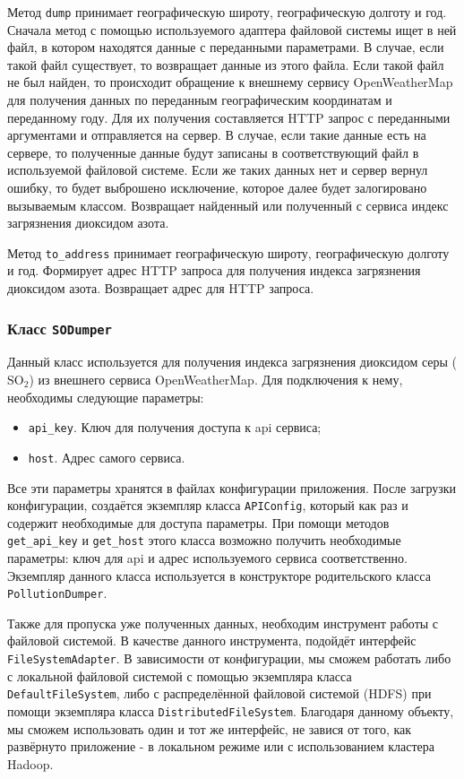 Метод \texttt{dump} принимает географическую широту, географическую долготу и год.
Сначала метод с помощью используемого адаптера файловой системы ищет в ней файл, в котором находятся данные с переданными параметрами.
В случае, если такой файл существует, то возвращает данные из этого файла.
Если такой файл не был найден, то происходит обращение к внешнему сервису OpenWeatherMap для получения данных по переданным географическим координатам и переданному году.
Для их получения составляется HTTP запрос с переданными аргументами и отправляется на сервер.
В случае, если такие данные есть на сервере, то полученные данные будут записаны в соответствующий файл в используемой файловой системе.
Если же таких данных нет и сервер вернул ошибку, то будет выброшено исключение, которое далее будет залогировано вызываемым классом.
Возвращает найденный или полученный с сервиса индекс загрязнения диоксидом азота.

Метод \texttt{to\_address} принимает географическую широту, географическую долготу и год.
Формирует адрес HTTP запроса для получения индекса загрязнения диоксидом азота.
Возвращает адрес для HTTP запроса.




\subsubsection{Класс \texttt{SODumper}}
Данный класс используется для получения индекса загрязнения диоксидом серы ($ \text{SO}_{\text{2}} $) из внешнего сервиса OpenWeatherMap.
Для подключения к нему, необходимы следующие параметры:

\begin{itemize}
\item \texttt{api\_key}. Ключ для получения доступа к api сервиса;
\item \texttt{host}. Адрес самого сервиса.
\end{itemize}

Все эти параметры хранятся в файлах конфигурации приложения.
После загрузки конфигурации, создаётся экземпляр класса \texttt{APIConfig}, который как раз и содержит необходимые для доступа параметры.
При помощи методов \texttt{get\_api\_key} и \texttt{get\_host} этого класса возможно получить необходимые параметры: ключ для api и адрес используемого сервиса соответственно.
Экземпляр данного класса используется в конструкторе родительского класса \texttt{PollutionDumper}.

Также для пропуска уже полученных данных, необходим инструмент работы с файловой системой.
В качестве данного инструмента, подойдёт интерфейс \texttt{FileSystemAdapter}.
В зависимости от конфигурации, мы сможем работать либо с локальной файловой системой с помощью экземпляра класса \texttt{DefaultFileSystem}, либо с распределённой файловой системой (HDFS) при помощи экземпляра класса \texttt{DistributedFileSystem}.
Благодаря данному объекту, мы сможем использовать один и тот же интерфейс, не завися от того, как развёрнуто приложение - в локальном режиме или с использованием кластера Hadoop.

